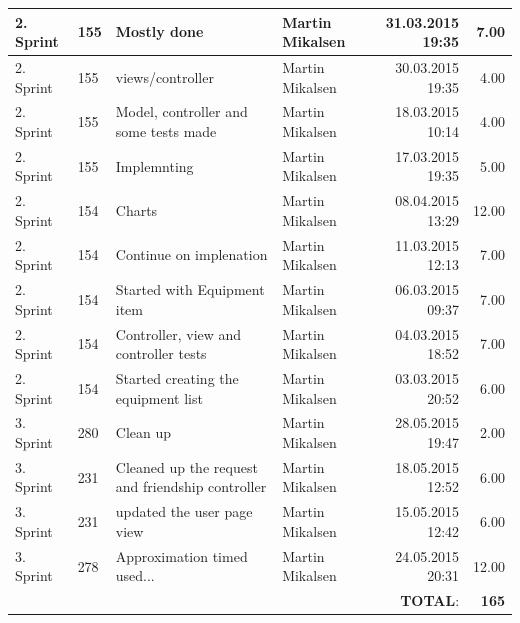 \documentclass[a4paper]{article}
\begin{document}
\begin{landscape}
\begin{tabular}{|l|l|l|l|r|r|}
2. Sprint & 155 & Mostly done & Martin Mikalsen & 31.03.2015 19:35 & 7.00 \\ \hline
2. Sprint & 155 & views/controller & Martin Mikalsen & 30.03.2015 19:35 & 4.00 \\ \hline
2. Sprint & 155 & Model, controller and some tests made & Martin Mikalsen & 18.03.2015 10:14 & 4.00 \\ \hline
2. Sprint & 155 & Implemnting & Martin Mikalsen & 17.03.2015 19:35 & 5.00 \\ \hline
2. Sprint & 154 & Charts & Martin Mikalsen & 08.04.2015 13:29 & 12.00 \\ \hline
2. Sprint & 154 & Continue on implenation & Martin Mikalsen & 11.03.2015 12:13 & 7.00 \\ \hline
2. Sprint & 154 & Started with Equipment item & Martin Mikalsen & 06.03.2015 09:37 & 7.00 \\ \hline
2. Sprint & 154 & Controller, view and controller tests & Martin Mikalsen & 04.03.2015 18:52 & 7.00 \\ \hline
2. Sprint & 154 & Started creating the equipment list & Martin Mikalsen & 03.03.2015 20:52 & 6.00 \\ \hline
3. Sprint & 280 & Clean up & Martin Mikalsen & 28.05.2015 19:47 & 2.00 \\ \hline
3. Sprint & 231 & Cleaned up the request and friendship controller  & Martin Mikalsen & 18.05.2015 12:52 & 6.00 \\ \hline
3. Sprint & 231 & updated the user page view & Martin Mikalsen & 15.05.2015 12:42 & 6.00 \\ \hline
3. Sprint & 278 & Approximation timed used... & Martin Mikalsen & 24.05.2015 20:31 & 12.00 \\ \hline
 & & & &\textbf{TOTAL}: & \textbf{165} \\ \hline
\end{tabular}



\end{landscape}
\end{document}
